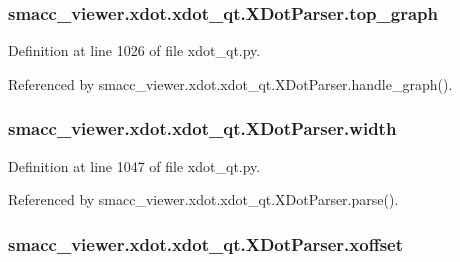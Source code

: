 \subsubsection[{\texorpdfstring{top\+\_\+graph}{top_graph}}]{\setlength{\rightskip}{0pt plus 5cm}smacc\+\_\+viewer.\+xdot.\+xdot\+\_\+qt.\+X\+Dot\+Parser.\+top\+\_\+graph}\hypertarget{classsmacc__viewer_1_1xdot_1_1xdot__qt_1_1XDotParser_a0c1dc848b360f50e49aff2b0e0c9c0b1}{}\label{classsmacc__viewer_1_1xdot_1_1xdot__qt_1_1XDotParser_a0c1dc848b360f50e49aff2b0e0c9c0b1}


Definition at line 1026 of file xdot\+\_\+qt.\+py.



Referenced by smacc\+\_\+viewer.\+xdot.\+xdot\+\_\+qt.\+X\+Dot\+Parser.\+handle\+\_\+graph().

\subsubsection[{\texorpdfstring{width}{width}}]{\setlength{\rightskip}{0pt plus 5cm}smacc\+\_\+viewer.\+xdot.\+xdot\+\_\+qt.\+X\+Dot\+Parser.\+width}\hypertarget{classsmacc__viewer_1_1xdot_1_1xdot__qt_1_1XDotParser_af11acc2d827c230ae2b02d0997aebe98}{}\label{classsmacc__viewer_1_1xdot_1_1xdot__qt_1_1XDotParser_af11acc2d827c230ae2b02d0997aebe98}


Definition at line 1047 of file xdot\+\_\+qt.\+py.



Referenced by smacc\+\_\+viewer.\+xdot.\+xdot\+\_\+qt.\+X\+Dot\+Parser.\+parse().

\subsubsection[{\texorpdfstring{xoffset}{xoffset}}]{\setlength{\rightskip}{0pt plus 5cm}smacc\+\_\+viewer.\+xdot.\+xdot\+\_\+qt.\+X\+Dot\+Parser.\+xoffset}\hypertarget{classsmacc__viewer_1_1xdot_1_1xdot__qt_1_1XDotParser_ad38758cbc4a074812fb8579c3d13222a}{}\label{classsmacc__viewer_1_1xdot_1_1xdot__qt_1_1XDotParser_ad38758cbc4a074812fb8579c3d13222a}


